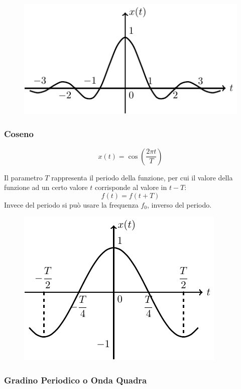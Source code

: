 \documentclass{article}
\numberwithin{equation}{subsection}
\begin{document}
\begin{figure}[H]%
    \centering
    \includegraphics{seno-cardinale.pdf}%
\end{figure}

\subsubsection{Coseno}

\begin{equation}
    x(t)=\cos\left(\displaystyle\frac{2\pi t}{T}\right)
\end{equation}

Il parametro $T$ rappresenta il periodo della funzione, per cui il valore della funzione ad un certo valore $t$ corrisponde al valore in $t-T$:
\begin{equation}
    f(t)=f(t+T)
\end{equation} 
Invece del periodo si può 
usare la frequenza $f_0$, inverso del periodo. 

\begin{figure}[H]%
    \centering
    \includegraphics{coseno.pdf}%
\end{figure}

\subsubsection{Gradino Periodico o Onda Quadra}
\end{document}
